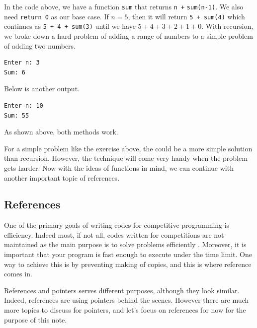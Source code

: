 \documentclass[../../../main.tex]{subfiles}
\begin{document}
\begin{solution}
In the code above, we have a function \verb|sum| that returns
\verb|n +| \newline \verb|sum(n-1)|. We also need \verb|return 0|
as our base case. If $n = 5$, then it will return \verb|5 + sum(4)|
which continues as \verb|5 + 4 + sum(3)| until we have $5 + 4 + 3 +
2 + 1 + 0$. With recursion, we broke down a hard problem of adding
a range of numbers to a simple problem of adding two numbers.

\begin{outputboxSolution}
\begin{lstlisting}[style=basic]
Enter n: 3
Sum: 6
\end{lstlisting}
\end{outputboxSolution}

Below is another output.

\begin{outputboxSolution}
\begin{lstlisting}[style=basic]
Enter n: 10
Sum: 55
\end{lstlisting}
\end{outputboxSolution}

As shown above, both methods work.
\end{solution}

For a simple problem like the exercise above, the could be a more
simple solution than recursion. However, the technique will come
very handy when the problem gets harder. Now with the ideas of
functions in mind, we can continue with another important topic of
references.

\subsection{References}

One of the primary goals of writing codes for competitive programming
is efficiency. Indeed most, if not all, codes written for competitions
are not maintained as the main purpose is to solve problems
efficiently \cite{CS02-3}. Moreover, it is important that your
program is fast enough to execute under the time limit. One way to
achieve this is by preventing making of copies, and this is where
reference comes in.

References and pointers serves different purposes, although they look
similar. Indeed, references are using pointers behind the scenes.
However there are much more topics to discuss for pointers, and let's
focus on references for now for the purpose of this note.
\end{document}
